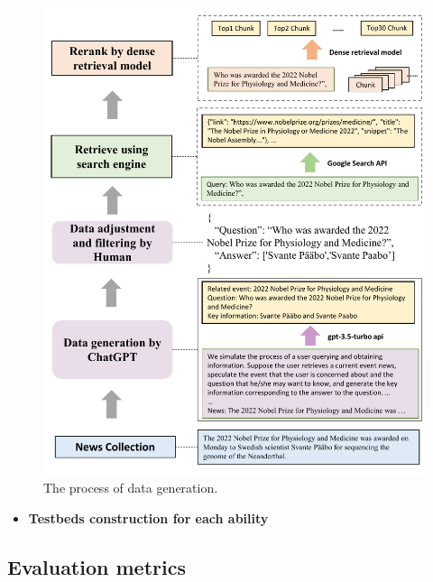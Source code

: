 \documentclass{beamer}
\begin{document}
\begin{frame}
    \begin{figure}[h]
        \centering
        \includegraphics[height=.75\textheight]{./images/figures/data.pdf}
        \caption{The process of data generation.}
    \end{figure}
    \begin{itemize}
        \item {\bfseries{Testbeds construction for each ability}}
    \end{itemize}
\end{frame}

\subsection{Evaluation metrics}
\end{document}
